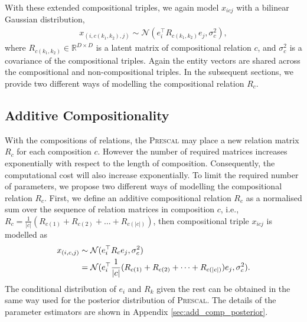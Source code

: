 With these extended compositional triples, we again model $x_{icj}$ with a bilinear Gaussian distribution,
\begin{align}
x_{(i, {{c}(k_1, k_2)}, j)} \sim \mathcal{N}(e_i^\top R_{{c}(k_1,k_2)} e_j, \sigma_{c}^2),
\end{align}
where $R_{{c}(k_1,k_2)} \in \mathbb{R}^{D\times D}$ is a latent matrix of compositional relation $c$, and $
\sigma_{c}^2$ is a covariance of the compositional triples. Again the entity vectors are shared across the compositional and non-compositional triples.
In the subsequent sections, we provide two different ways of modelling the compositional relation $R_c$.

\subsection{Additive Compositionality}
With the compositions of relations, the \textsc{Prescal} may place a new relation matrix $R_c$ for each composition $c$. However the number of required matrices increases exponentially with respect to the length of composition. Consequently, the computational cost will also increase exponentially.
To limit the required number of parameters, we propose two different ways of modelling the compositional relation $R_c$.
First, we define an additive compositional relation $R_c$ as a normalised sum over
the sequence of relation matrices in composition $c$, i.e.,
$R_{{c}} = \frac{1}{|c|}(R_{c(1)} + R_{c(2)} + \dots + R_{c(|c|)})$, then compositional triple $x_{icj}$
is modelled as
\begin{align}
x_{(i, c, j)} &\sim \mathcal{N}(e_i^\top R_c e_j, \sigma_{c}^2) \\
&= \mathcal{N}(e_i^\top \frac{1}{|c|}(R_{c(1)} + R_{c(2)} + \dots + R_{c(|c|)}) e_j, \sigma_{c}^2). \notag
\end{align}
The conditional distribution of $e_i$ and $R_k$ given the rest can be obtained in the same way used for the posterior distribution of \textsc{Prescal}. The details of the parameter estimators are shown in Appendix \ref{sec:add_comp_posterior}.

